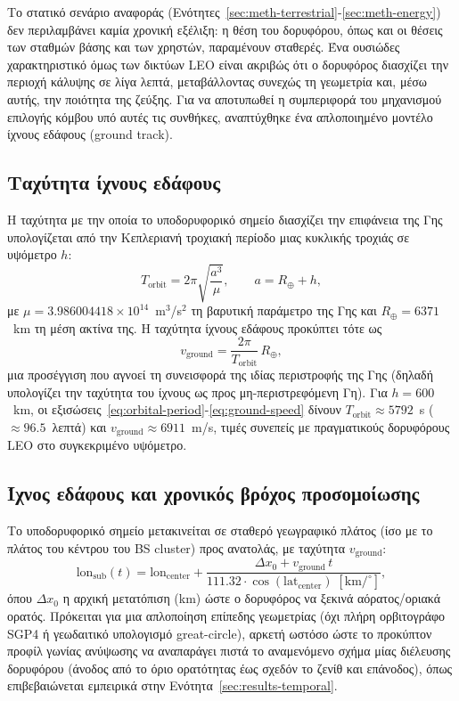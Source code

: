 Το στατικό σενάριο αναφοράς (Ενότητες~\ref{sec:meth-terrestrial}-\ref{sec:meth-energy})
δεν περιλαμβάνει καμία χρονική εξέλιξη: η θέση του δορυφόρου, όπως και οι
θέσεις των σταθμών βάσης και των χρηστών, παραμένουν σταθερές. Ένα
ουσιώδες χαρακτηριστικό όμως των δικτύων LEO είναι ακριβώς ότι ο
δορυφόρος διασχίζει την περιοχή κάλυψης σε λίγα λεπτά, μεταβάλλοντας
συνεχώς τη γεωμετρία και, μέσω αυτής, την ποιότητα της ζεύξης. Για να
αποτυπωθεί η συμπεριφορά του μηχανισμού επιλογής κόμβου υπό αυτές τις
συνθήκες, αναπτύχθηκε ένα απλοποιημένο μοντέλο ίχνους εδάφους (ground
track).

\subsection{Ταχύτητα ίχνους εδάφους}

Η ταχύτητα με την οποία το υποδορυφορικό σημείο διασχίζει την επιφάνεια
της Γης υπολογίζεται από την Κεπλεριανή τροχιακή περίοδο μιας κυκλικής
τροχιάς σε υψόμετρο $h$:
\begin{equation}
T_{\text{orbit}} = 2\pi\sqrt{\frac{a^3}{\mu}}, \qquad a = R_\oplus + h,
\label{eq:orbital-period}
\end{equation}
με $\mu = 3.986004418\times10^{14}$~m$^3$/s$^2$ τη βαρυτική παράμετρο της
Γης και $R_\oplus = 6371$~km τη μέση ακτίνα της. Η ταχύτητα ίχνους εδάφους
προκύπτει τότε ως
\begin{equation}
v_{\text{ground}} = \frac{2\pi}{T_{\text{orbit}}} \, R_\oplus,
\label{eq:ground-speed}
\end{equation}
μια προσέγγιση που αγνοεί τη συνεισφορά της ιδίας περιστροφής της Γης
(δηλαδή υπολογίζει την ταχύτητα του ίχνους ως προς μη-περιστρεφόμενη Γη).
Για $h = 600$~km, οι εξισώσεις~\eqref{eq:orbital-period}-\eqref{eq:ground-speed}
δίνουν $T_{\text{orbit}} \approx 5792$~s ($\approx 96.5$~λεπτά) και
$v_{\text{ground}} \approx 6911$~m/s, τιμές συνεπείς με πραγματικούς
δορυφόρους LEO στο συγκεκριμένο υψόμετρο.

\subsection{Ίχνος εδάφους και χρονικός βρόχος προσομοίωσης}

Το υποδορυφορικό σημείο μετακινείται σε σταθερό γεωγραφικό πλάτος (ίσο με
το πλάτος του κέντρου του BS cluster) προς ανατολάς, με ταχύτητα
$v_{\text{ground}}$:
\begin{equation}
\text{lon}_{\text{sub}}(t) = \text{lon}_{\text{center}} +
\frac{\Delta x_0 + v_{\text{ground}} \, t}{111.32 \cdot \cos(\text{lat}_{\text{center}}) \; [\text{km/}^\circ]},
\label{eq:ground-track}
\end{equation}
όπου $\Delta x_0$ η αρχική μετατόπιση (km) ώστε ο δορυφόρος να ξεκινά
αόρατος/οριακά ορατός. Πρόκειται για μια απλοποίηση επίπεδης γεωμετρίας
(όχι πλήρη ορβιτογράφο SGP4 ή γεωδαιτικό υπολογισμό great-circle), αρκετή
ωστόσο ώστε το προκύπτον προφίλ γωνίας ανύψωσης να αναπαράγει πιστά το
αναμενόμενο σχήμα μίας διέλευσης δορυφόρου (άνοδος από το όριο ορατότητας
έως σχεδόν το ζενίθ και επάνοδος), όπως επιβεβαιώνεται εμπειρικά στην
Ενότητα~\ref{sec:results-temporal}.

